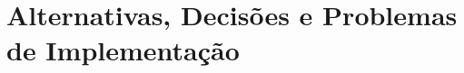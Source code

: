 	
\begin{longlisting}
  \inputminted{text}{testes/outrosTestes/tipos/expressaoeTipos/resTermoBooleano2.txt}

\end{longlisting}





\begin{longlisting}
  \inputminted{text}{testes/outrosTestes/tipos/expressaoeTipos/termoBooleano.txt}

\end{longlisting}




	
\begin{longlisting}
  \inputminted{text}{testes/outrosTestes/tipos/expressaoeTipos/resTermoBooleano.txt}

\end{longlisting}





\begin{longlisting}
  \inputminted{text}{testes/outrosTestes/tipos/variaveisTipos/atribBooleano.txt}

\end{longlisting}




	
\begin{longlisting}
  \inputminted{text}{testes/outrosTestes/tipos/variaveisTipos/resAtribBooleano.txt}

\end{longlisting}








\section{Alternativas, Decisões e Problemas de Implementação}
\label{sec:alternativas:testes}



